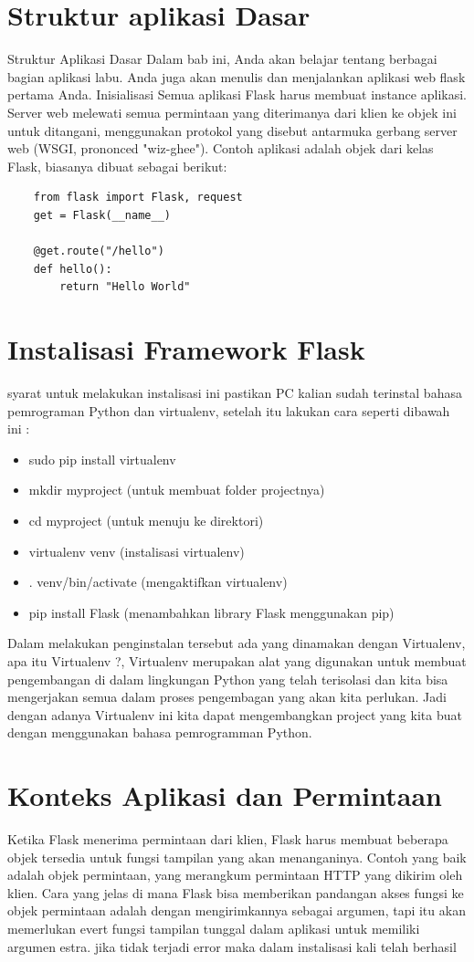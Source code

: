 \section{Struktur aplikasi Dasar}
Struktur Aplikasi Dasar 
Dalam bab ini, Anda akan belajar tentang berbagai bagian aplikasi labu. Anda juga akan menulis dan menjalankan aplikasi web flask pertama Anda. 
Inisialisasi 
Semua aplikasi Flask harus membuat instance aplikasi. Server web melewati semua permintaan yang diterimanya dari klien ke objek ini untuk ditangani, menggunakan protokol yang disebut antarmuka gerbang server web (WSGI, prononced "wiz-ghee"). 
Contoh aplikasi adalah objek dari kelas Flask, biasanya dibuat sebagai berikut: 

\begin{verbatim}
    from flask import Flask, request
    get = Flask(__name__)
    
    @get.route("/hello")
    def hello():
        return "Hello World"
\end{verbatim}


\section{Instalisasi Framework Flask}
syarat untuk melakukan instalisasi ini pastikan PC kalian sudah terinstal bahasa pemrograman Python dan virtualenv, setelah
itu lakukan cara seperti dibawah ini :
\begin{itemize}
    \item sudo pip install virtualenv 
    \item mkdir myproject (untuk membuat folder projectnya)
    \item cd myproject (untuk menuju ke direktori)
    \item virtualenv venv (instalisasi virtualenv)
    \item . venv/bin/activate (mengaktifkan virtualenv)
    \item pip install Flask (menambahkan library Flask menggunakan pip)
\end{itemize}
Dalam melakukan penginstalan tersebut ada yang dinamakan dengan Virtualenv, apa itu Virtualenv ?, Virtualenv merupakan alat yang
digunakan untuk membuat pengembangan di dalam lingkungan Python yang telah terisolasi dan kita bisa mengerjakan semua dalam
proses pengembagan yang akan kita perlukan. Jadi dengan adanya Virtualenv ini kita dapat mengembangkan project yang kita buat
dengan menggunakan bahasa pemrogramman Python.

\section{Konteks Aplikasi dan Permintaan}
Ketika Flask menerima permintaan dari klien, Flask harus membuat beberapa objek tersedia untuk fungsi tampilan yang akan menanganinya. Contoh yang baik adalah objek permintaan, yang merangkum permintaan HTTP yang dikirim oleh klien. Cara yang jelas di mana Flask bisa memberikan pandangan akses fungsi ke objek permintaan adalah dengan mengirimkannya sebagai argumen, tapi itu akan memerlukan evert fungsi tampilan tunggal dalam aplikasi untuk memiliki argumen estra.
jika tidak terjadi error maka dalam instalisasi kali telah berhasil

